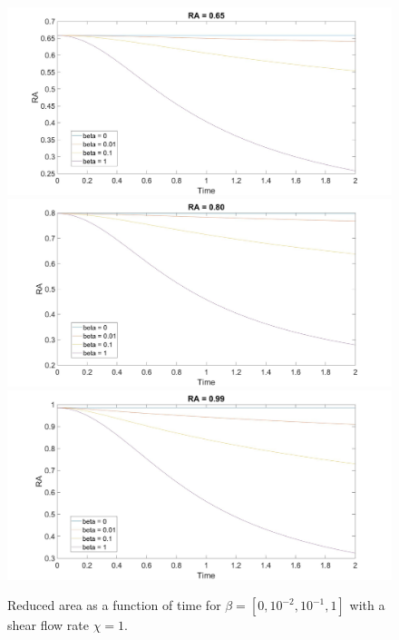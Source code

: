 \documentclass[aps,prl,showpacs]{revtex4}
\begin{document}
\begin{figure}
	\centering
	\includegraphics[width=.9\textwidth]{figures/7.jpg}
	\includegraphics[width=.9\textwidth]{figures/8.jpg}
	\includegraphics[width=.9\textwidth]{figures/9.jpg}
	\caption{Reduced area as a function of time for $\beta = [0, 10^{-2},10^{-1}, 1]$ with a shear flow rate $\chi = 1$.}
\end{figure}
\end{document}

